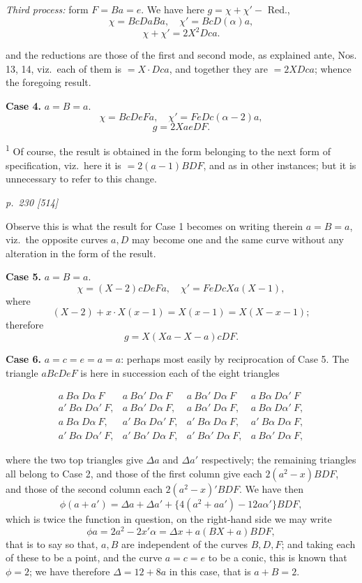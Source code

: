 \documentclass[11pt,a4paper]{book}
\begin{document}
\textit{Third process:}  form $F=Ba=e$.  We have here $g=\chi+\chi'-$ Red.,
\[
\chi=BcDaBa, \quad \chi'=BcD(\alpha)a,
\]
\[
\chi+\chi'=2X^2 Dca.
\]

and the reductions are those of the first and second mode, as explained ante, Nos.
13, 14, viz.\ each of them is $=X\cdot Dca$, and together they are $=2XDca$; whence the
foregoing result.

\textbf{Case 4.}  $a=B=a$.
\[
\chi=BcDeFa, \quad \chi'=FeDc(\alpha-2)a,
\]
\[
g=2XaeDF.
\]

\vspace{0.5em}
\noindent\textsuperscript{1} Of course, the result is obtained in the form belonging to the next form of specification, viz.\ here it
is $=2(a-1)BDF$, and as in other instances; but it is unnecessary to refer to this change.

\clearpage

\bigskip
\textit{p.~230 [514]}
\smallskip

Observe this is what the result for Case 1 becomes on writing therein $a=B=a$,
viz.\ the opposite curves $a, D$ may become one and the same curve without any
alteration in the form of the result.

\textbf{Case 5.}  $a=B=a$.
\[
\chi=(X-2)cDeFa, \quad \chi'=FeDcXa(X-1),
\]
where
\[
(X-2)+x\cdot X(x-1)=X(x-1)=X(X-x-1);
\]
therefore
\[
g=X(Xa-X-a)cDF.
\]

\textbf{Case 6.}  $a=c=e=a=a$:  perhaps most easily by reciprocation of Case 5.  The
triangle $aBcDeF$ is here in succession each of the eight triangles

\[
\begin{array}{cccc}
a\ B\alpha\ D\alpha\ F & a\ B\alpha'\ D\alpha\ F & a\ B\alpha'\ D\alpha\ F & a\ B\alpha\ D\alpha'\ F \\
a'\ B\alpha\ D\alpha'\ F, & a\ B\alpha'\ D\alpha\ F, & a\ B\alpha'\ D\alpha\ F, & a\ B\alpha\ D\alpha'\ F, \\
a\ B\alpha\ D\alpha\ F, & a'\ B\alpha\ D\alpha'\ F, & a'\ B\alpha\ D\alpha\ F, & a'\ B\alpha\ D\alpha\ F, \\
a'\ B\alpha\ D\alpha'\ F, & a'\ B\alpha'\ D\alpha\ F, & a'\ B\alpha'\ D\alpha\ F, & a\ B\alpha'\ D\alpha\ F,
\end{array}
\]

where the two top triangles give $\Delta a$ and $\Delta a'$ respectively; the remaining triangles all
belong to Case 2, and those of the first column give each $2(a^2-x)BDF$, and those
of the second column each $2(a^2-x)'BDF$.  We have then
\[
\phi(a+a')=\Delta a+\Delta a'+\{4(a^2+aa')-12a\alpha'\}BDF,
\]
which is twice the function in question, on the right-hand side we may write
\[
\phi a=2a^2-2x'\alpha=\Delta x+a(BX+a)BDF,
\]
that is to say so that, $a, B$ are independent of the curves $B, D, F$; and taking
each of these to be a point, and the curve $a=c=e$ to be a conic, this is known
that $\phi=2$; we have therefore $\Delta=12+8a$ in this case, that is $a+B=2$.
\end{document}
